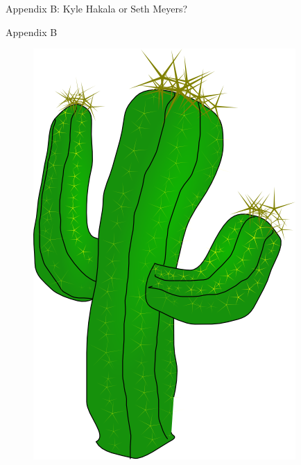 \documentclass[xcolor=dvipsnames,aspectratio=1610]{beamer}
\begin{document}
\begin{frame}{Appendix B: Kyle Hakala or Seth Meyers?}
  \end{frame}

  \begin{frame}{Appendix B}
      \begin{figure}
        \includegraphics[scale=0.6]{cactus.png}
      \end{figure}
  \end{frame}
\end{document}
